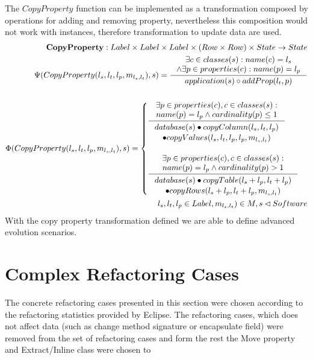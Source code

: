 \documentclass[11pt]{article}
\begin{document}
The $CopyProperty$ function can be implemented as a transformation composed by operations for adding and removing property, nevertheless this composition would not work with instances, therefore transformation to update data are used.
\begin{align*}
	\mathbf{CopyProperty} : Label \times Label \times Label \times (Row \times Row) \times State \rightarrow State \\
	\Psi(CopyProperty(l_s, l_t, l_p, m_{l_s, l_t}), s) = \inference{\exists c \in classes(s) : name(c) = l_s \\ \wedge \exists p \in properties(c) : name(p) = l_p }{application(s) \circ addProp(l_t, p)} 
	\\\\
	\Phi(CopyProperty(l_s, l_t, l_p, m_{l_s, l_t}), s) = \begin{cases}
		\inference{\exists p \in properties(c), c \in classes(s) : \\ name(p) = l_p \wedge cardinality(p) \leq 1 }{\begin{gathered}
			database(s) \bullet copyColumn(l_s, l_t, l_p) \\ \bullet copyValues(l_s, l_t, l_p, l_p, m_{l_s, l_t}) 
			\end{gathered}} \\ \\
		\inference{\exists p \in properties(c), c \in classes(s) : \\ name(p) = l_p \wedge cardinality(p) > 1}{\begin{gathered}
			database(s) \bullet copyTable(l_s + l_p, l_t + l_p) \\ \bullet copyRows(l_s + l_p, l_t + l_p, m_{l_s, l_t}) 
			\end{gathered}}
 \end{cases}\\
 l_s, l_t, l_p \in Label,  m_{l_s, l_t}) \in M, s \lhd Software
\end{align*}
With the copy property transformation defined we are able to define advanced evolution scenarios.


\section{Complex Refactoring Cases}
The concrete refactoring cases presented in this section were chosen according to the refactoring statistics provided by Eclipse. The refactoring cases, which does not affect data (such as change method signature or encapsulate field) were removed from the set of refactoring cases and form the rest the Move property and Extract/Inline class were chosen to 
\end{document}
